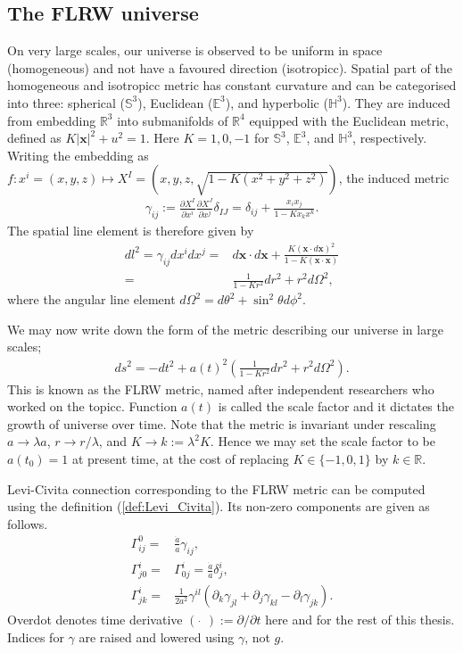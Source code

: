 \subsection{The FLRW universe}
On very large scales, our universe is observed to be uniform in space (homogeneous) and not have a favoured direction (isotropicc). Spatial part of the homogeneous and isotropicc metric has constant curvature and can be categorised into three: spherical ($\mathbb{S}^3$), Euclidean ($\mathbb{E}^3$), and hyperbolic ($\mathbb{H}^3$). They are induced from embedding $\mathbb{R}^3$ into submanifolds of $\mathbb{R}^4$ equipped with the Euclidean metric, defined as $K|\mathbf{x}|^2 + u^2 = 1$. Here $K=1,0,-1$ for $\mathbb{S}^3$, $\mathbb{E}^3$, and $\mathbb{H}^3$, respectively. Writing the embedding as $f: x^i = (x,y,z) \mapsto X^I =(x,y,z,\sqrt{1-K(x^2+y^2+z^2)})$, the induced metric
\begin{align}
	\gamma_{ij} := \frac{\partial X^I}{\partial x^i} \frac{\partial X^J}{\partial x^j} \delta_{IJ}
	= \delta_{ij} + \frac{x_i x_j}{1-Kx_k x^k}. \label{eqn:FLRW_metric_spatial}
\end{align}
The spatial line element is therefore given by
\begin{align}
	dl^2 = \gamma_{ij} dx^i dx^j =& d\mathbf{x} \cdot d\mathbf{x} + \frac{K(\mathbf{x} \cdot d\mathbf{x})^2}{1-K (\mathbf{x} \cdot \mathbf{x})} \\
	=& \frac{1}{1-Kr^2} dr^2 + r^2 d\Omega^2,
\end{align}
where the angular line element $d\Omega^2 = d\theta^2 + \sin^2\theta d\phi^2$.

We may now write down the form of the metric describing our universe in large scales;
\begin{align}
	ds^2 = - dt^2 + a(t)^2 \left( \frac{1}{1-Kr^2} dr^2 + r^2 d\Omega^2 \right).
\end{align}
This is known as the FLRW metric, named after independent researchers who worked on the topicc. Function $a(t)$ is called the scale factor and it dictates the growth of universe over time. Note that the metric is invariant under rescaling $a \rightarrow \lambda a$, $r \rightarrow r / \lambda$, and $K \rightarrow k:= \lambda^2 K$. Hence we may set the scale factor to be $a(t_0) = 1$ at present time, at the cost of replacing $K \in \{-1,0,1\}$ by $k \in \mathbb{R}$.

Levi-Civita connection corresponding to the FLRW metric can be computed using the definition (\ref{def:Levi_Civita}). Its non-zero components are given as follows.
\begin{align}
	\Gamma^0_{ij} =& \frac{\dot{a}}{a} \gamma_{ij}, \\
	\Gamma^i_{j0} =& \Gamma^i_{0j} = \frac{\dot{a}}{a} \delta^i_j, \\
	\Gamma^i_{jk} =& \frac{1}{2a^2} \gamma^{il} \left( \partial_k \gamma_{jl} + \partial_j \gamma_{kl} - \partial_l \gamma_{jk} \right). 
\end{align}
Overdot denotes time derivative $(\,\, \dot{} \,\,) := \partial/\partial t$ here and for the rest of this thesis. Indices for $\gamma$ are raised and lowered using $\gamma$, not $g$.

